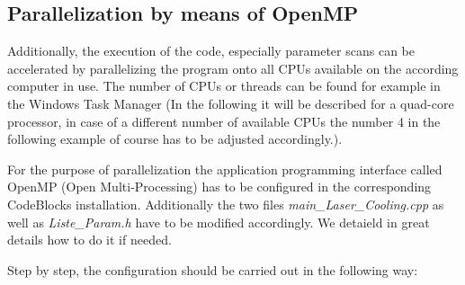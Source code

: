 \documentclass[amsmath,amssymb,nofootinbib]{revtex4-2}
\begin{document}
\subsection{Parallelization by means of OpenMP}

Additionally, the execution of the code, especially parameter scans can be accelerated by parallelizing the program onto all CPUs available on the according computer in use. The number of CPUs or threads can be found for example in the Windows Task Manager (In the following it will be described for a quad-core processor, in case of a different number of available CPUs the number 4 in the following example of course has to be adjusted accordingly.).

For the purpose of parallelization the application programming interface called OpenMP (Open Multi-Processing) has to be configured in the corresponding CodeBlocks installation. Additionally the two files \textit{main\_Laser\_Cooling.cpp} as well as \textit{Liste\_Param.h} have to be modified accordingly. We detaield in great details how to do it if needed.

Step by step, the configuration should be carried out in the following way:
\end{document}
